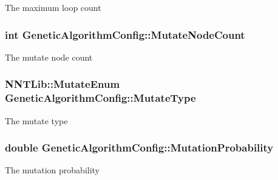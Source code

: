 The maximum loop count 

\hypertarget{class_genetic_algorithm_config_a79b354373f83b53c1acae61e3f6d7935}{}
\subsubsection[{Mutate\+Node\+Count}]{\setlength{\rightskip}{0pt plus 5cm}int Genetic\+Algorithm\+Config\+::\+Mutate\+Node\+Count}\label{class_genetic_algorithm_config_a79b354373f83b53c1acae61e3f6d7935}


The mutate node count 

\hypertarget{class_genetic_algorithm_config_ab6412ab79b082c2d36d241a03b8bea1a}{}
\subsubsection[{Mutate\+Type}]{\setlength{\rightskip}{0pt plus 5cm}N\+N\+T\+Lib\+::\+Mutate\+Enum Genetic\+Algorithm\+Config\+::\+Mutate\+Type}\label{class_genetic_algorithm_config_ab6412ab79b082c2d36d241a03b8bea1a}


The mutate type 

\hypertarget{class_genetic_algorithm_config_ac9ecafde07cb2dee58d5dc0bb4d2afa9}{}
\subsubsection[{Mutation\+Probability}]{\setlength{\rightskip}{0pt plus 5cm}double Genetic\+Algorithm\+Config\+::\+Mutation\+Probability}\label{class_genetic_algorithm_config_ac9ecafde07cb2dee58d5dc0bb4d2afa9}


The mutation probability 

\hypertarget{class_genetic_algorithm_config_a8e8f286ff257bb31ab7c4a64963be30b}{}
